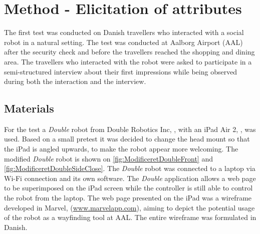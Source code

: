 \section{Method - Elicitation of attributes}
\label{MethodElicitation}
%
The first test was conducted on Danish travellers who interacted with a social robot in a natural setting. The test was conducted at Aalborg Airport (AAL) after the security check and before the travellers reached the shopping and dining area. The travellers who interacted with the robot were asked to participate in a semi-structured interview about their first impressions while being observed during both the interaction and the interview. 

\subsection{Materials}
For the test a \textit{Double} robot from Double Robotics Inc, \cite{WEB:Double}, with an iPad Air 2, \cite{WEB:iPadAir2}, was used. Based on a small pretest it was decided to change the head mount so that the iPad is angled upwards, to make the robot appear more welcoming. The modified \textit{Double} robot is shown on \autoref{fig:ModificeretDoubleFront} and \autoref{fig:ModificeretDoubleSideClose}. The \textit{Double} robot was connected to a laptop via Wi-Fi connection and its own software. The \textit{Double} application allows a web page to be superimposed on the iPad screen while the controller is still able to control the robot from the laptop. The web page presented on the iPad was a wireframe developed in Marvel, (\url{www.marvelapp.com}), aiming to depict the potential usage of the robot as a wayfinding tool at AAL. The entire wireframe was formulated in Danish.


